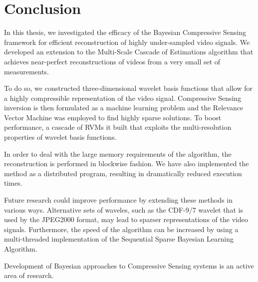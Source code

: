 \chapter{Conclusion}
\label{ch:conclusion}

In this thesis, we investigated the efficacy of the Bayesian Compressive Sensing framework for efficient reconstruction of highly under-sampled video signals.
We developed an extension to the Multi-Scale Cascade of Estimations algorithm that achieves near-perfect reconstructions of videos from a very small set of measurements.

To do so, we constructed three-dimensional wavelet basis functions that allow for a highly compressible representation of the video signal.
Compressive Sensing inversion is then formulated as a machine learning problem and the Relevance Vector Machine was employed to find highly sparse solutions.
To boost performance, a cascade of RVMs it built that exploits the multi-resolution properties of wavelet basis functions.

In order to deal with the large memory requirements of the algorithm, the reconstruction is performed in blockwise fashion.
We have also implemented the method as a distributed program, resulting in dramatically reduced execution times.

Future research could improve performance by extending these methods in various ways.
Alternative sets of waveles, such as the CDF-9/7 wavelet that is used by the JPEG2000 format, may lead to sparser representations of the video signals. 
Furthermore, the speed of the algorithm can be increased by using a multi-threaded implementation of the Sequential Sparse Bayesian Learning Algorithm. 

Development of Bayesian approaches to Compressive Sensing systems is an active area of research.

